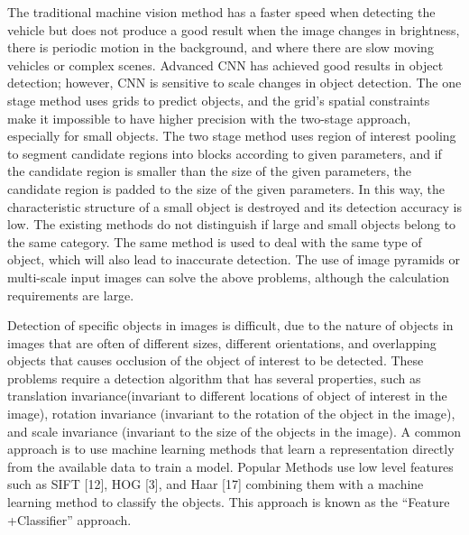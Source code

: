 \begin{sloppypar}
The traditional machine vision method has a faster speed when detecting the vehicle but does not produce a good result when the image changes in brightness, there is periodic motion in the background, and where there are slow moving vehicles or complex scenes. Advanced CNN has achieved good results in object detection; however, CNN is sensitive to scale changes in object detection. The one stage method uses grids to predict objects, and the grid’s spatial constraints make it impossible to have higher precision with the two-stage approach, especially for small objects. The two stage method uses region of interest pooling to segment candidate regions into blocks according to given parameters, and if the candidate region is smaller than the size of the given parameters, the candidate region is padded to the size of the given parameters. In this way, the characteristic structure of a small object is destroyed and its detection accuracy is low. The existing methods do not distinguish if large and small objects belong to the same category. The same method is used to deal with the same type of object, which will also lead to inaccurate detection. The use of image pyramids or multi-scale input images can solve the above problems, although the calculation requirements are large.


Detection of specific objects in images is difficult, due to the nature of objects in images that are often of different sizes, different orientations, and overlapping objects that causes occlusion of the object of interest to be detected. These problems require a detection algorithm that has several properties, such as translation invariance(invariant to different locations of object of interest in the image), rotation invariance (invariant to the rotation of the object in the image), and scale invariance (invariant to the size of the objects in the image). A common approach is to use machine learning methods that learn a representation directly from the available data to train a model. Popular Methods use low level features such as SIFT [12], HOG [3], and Haar [17] combining them with a machine learning method to classify the objects. This approach is known as the “Feature +Classifier'' approach.


\end{sloppypar}
